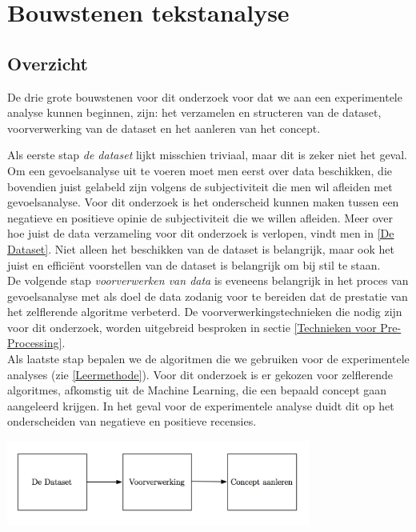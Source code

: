 \chapter{Bouwstenen tekstanalyse}\label{Lectuur}

\section{Overzicht}\label{Overzicht}

 De drie grote bouwstenen voor dit onderzoek voor dat we aan een experimentele analyse kunnen beginnen, zijn: het verzamelen en structeren van de dataset, voorverwerking van de dataset en het aanleren van het concept.

Als eerste stap \textit{de dataset} lijkt misschien triviaal, maar dit is zeker niet het geval. Om een gevoelsanalyse uit te voeren moet men eerst over data beschikken, die bovendien juist gelabeld zijn volgens de subjectiviteit die men wil afleiden met gevoelsanalyse. Voor dit onderzoek is het onderscheid kunnen maken tussen een negatieve en positieve opinie de subjectiviteit die we willen afleiden. Meer over hoe juist de data verzameling voor dit onderzoek is verlopen, vindt men in \ref{De Dataset}. Niet alleen het beschikken van de dataset is belangrijk, maar ook het juist en effici\"ent voorstellen van de dataset is belangrijk om bij stil te staan.\\

De volgende stap \textit{voorverwerken van data}  is eveneens belangrijk in het proces van gevoelsanalyse met als doel de data zodanig voor te bereiden dat de prestatie van het zelflerende algoritme verbeterd. De voorverwerkingstechnieken die nodig zijn voor dit onderzoek, worden uitgebreid besproken in sectie \ref{Technieken voor Pre-Processing}.\\

Als laatste stap  bepalen we de algoritmen die we gebruiken voor de experimentele analyses (zie \ref{Leermethode}). Voor dit onderzoek is  er gekozen voor zelflerende algoritmes, afkomstig uit de Machine Learning, die een bepaald concept gaan aangeleerd krijgen. In het geval voor de experimentele analyse duidt dit op het onderscheiden van negatieve en positieve recensies.

\begin{center}
  \includegraphics[width=10cm]{overzicht}
  \label{fig:beslissingsboom}
\end{center}

